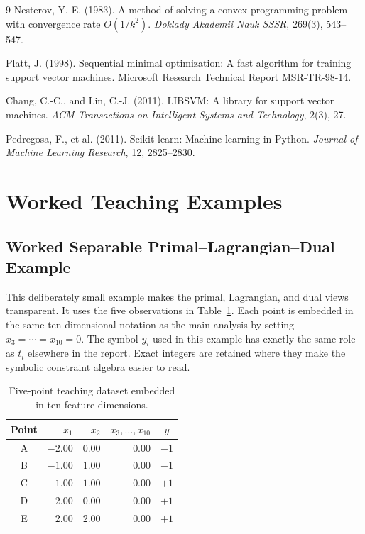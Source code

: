 \documentclass[11pt,a4paper]{article}
\numberwithin{equation}{section} %
\begin{document}
\begin{thebibliography}{9}
Nesterov, Y. E. (1983).
A method of solving a convex programming problem with convergence rate
$O(1/k^2)$. \textit{Doklady Akademii Nauk SSSR}, 269(3), 543--547.

Platt, J. (1998).
Sequential minimal optimization: A fast algorithm for training support vector
machines. Microsoft Research Technical Report MSR-TR-98-14.

Chang, C.-C., and Lin, C.-J. (2011).
LIBSVM: A library for support vector machines.
\textit{ACM Transactions on Intelligent Systems and Technology}, 2(3), 27.

Pedregosa, F., et al. (2011).
Scikit-learn: Machine learning in Python.
\textit{Journal of Machine Learning Research}, 12, 2825--2830.

\end{thebibliography}

\appendix

\section{Worked Teaching Examples}
\label{app:worked-examples}

\subsection{Worked Separable Primal--Lagrangian--Dual Example}
\label{sec:toy-primal-dual}

This deliberately small example makes the primal, Lagrangian, and dual
views transparent. It uses the
five observations in Table~\ref{tab:toy-data}. Each point is embedded in the
same ten-dimensional notation as the main analysis by setting
$x_3=\cdots=x_{10}=0$. The symbol $y_i$ used in this example has exactly the
same role as $t_i$ elsewhere in the report. Exact integers are retained where
they make the symbolic constraint algebra easier to read.

\begin{table}[htbp]
\centering
\caption{Five-point teaching dataset embedded in ten feature dimensions.}
\label{tab:toy-data}
\begin{tabular}{crrrc}
\toprule
Point & $x_1$ & $x_2$ & $x_3,\ldots,x_{10}$ & $y$ \\
\midrule
A & $-2.00$ & $0.00$ & $0.00$ & $-1$ \\
B & $-1.00$ & $1.00$ & $0.00$ & $-1$ \\
C & $1.00$ & $1.00$ & $0.00$ & $+1$ \\
D & $2.00$ & $0.00$ & $0.00$ & $+1$ \\
E & $2.00$ & $2.00$ & $0.00$ & $+1$ \\
\bottomrule
\end{tabular}
\end{table}
\end{document}
